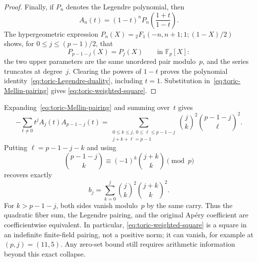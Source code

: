 \begin{proof}
Finally, if $P_n$ denotes the Legendre polynomial, then
\[
 A_n(t)=(1-t)^nP_n\!\left(\frac{1+t}{1-t}\right).
\]
The hypergeometric expression
$P_n(X)={}_2F_1(-n,n+1;1;(1-X)/2)$ shows, for
$0\leq j\leq(p-1)/2$, that
\[
 P_{p-1-j}(X)=P_j(X)\qquad\text{in }\mathbb F_p[X]:
\]
the two upper parameters are the same unordered pair modulo~$p$, and the
series truncates at degree~$j$.  Clearing the powers of $1-t$ proves the
polynomial identity~\eqref{eq:toric-Legendre-duality}, including $t=1$.
Substitution in~\eqref{eq:toric-Mellin-pairing} gives
\eqref{eq:toric-weighted-square}.
\end{proof}

\begin{remark}
\label{rem:toric-Mellin-tautology}
Expanding~\eqref{eq:toric-Mellin-pairing} and summing over~$t$ gives
\[
 -\sum_{t\ne0}t^jA_j(t)A_{p-1-j}(t)
 =\sum_{\substack{0\leq k\leq j,\ 0\leq\ell\leq p-1-j\\
                   j+k+\ell=p-1}}
   \binom jk^2\binom{p-1-j}{\ell}^2.
\]
Putting $\ell=p-1-j-k$ and using
\[
 \binom{p-1-j}{k}\equiv(-1)^k\binom{j+k}{k}\pmod p
\]
recovers exactly
\[
 b_j=\sum_{k=0}^j\binom jk^2\binom{j+k}{k}^2.
\]
For $k>p-1-j$, both sides vanish modulo~$p$ by the same carry.  Thus the
quadratic fiber sum, the Legendre pairing, and the original Ap\'ery
coefficient are coefficientwise equivalent.  In particular,
\eqref{eq:toric-weighted-square} is a square in an indefinite finite-field
pairing, not a positive norm; it can vanish, for example at $(p,j)=(11,5)$.
Any zero-set bound still requires arithmetic information beyond this exact
collapse.
\end{remark}
